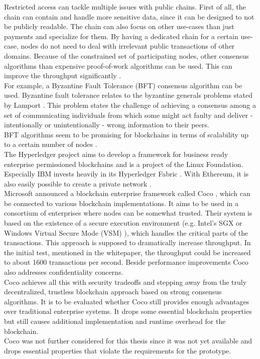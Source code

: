 \documentclass[a4paper,12pt]{scrartcl}
\begin{document}
Restricted access can tackle multiple issues with public chains. First of all, the chain can contain and handle more sensitive data, since it can be designed to not be publicly readable. The chain can also focus on other use-cases than just payments and specialize for them. By having a dedicated chain for a certain use-case, nodes do not need to deal with irrelevant public transactions of other domains. Because of the constrained set of participating nodes, other consensus algorithms than expensive proof-of-work algorithms can be used. This can improve the throughput significantly \cite{Pongnumkul2017}.\\

For example, a Byzantine Fault Tolerance (BFT) consensus algorithm can be used. Byzantine fault tolerance \cite{Jackson2005} relates to the byzantine generals problems stated by Lamport \cite{Lamport1982}. This problem states the challenge of achieving a consensus among a set of communicating individuals from which some might act faulty and deliver - intentionally or unintentionally - wrong information to their peers.\\
BFT algorithms seem to be promising for blockchains in terms of scalability up to a certain number of nodes \cite{Vukoli2016}\cite{Sousa2017}.\\

The Hyperledger project \cite{web89} aims to develop a framework for business ready enterprise permissioned blockchains and is a project of the Linux Foundation. Especially IBM invests heavily in its Hyperledger Fabric \cite{Cachin2016}. With Ethereum, it is also easily possible to create a private network \cite{web91}.\\

Microsoft announced a blockchain enterprise framework called Coco \cite{Coco2017}, which can be connected to various blockchain implementations. It aims to be used in a consortium of enterprises where nodes can be somewhat trusted. Their system is based on the existence of a secure execution environment (e.g. Intel's SGX \cite{web20} or Windows Virtual Secure Mode (VSM) \cite{web21}), which handles the critical parts of the transactions. This approach is supposed to dramatically increase throughput. In the initial test, mentioned in the whitepaper, the throughput could be increased to about 1600 transactions per second. Beside performance improvements Coco also addresses confidentiality concerns.\\
Coco achieves all this with security tradeoffs and stepping away from the truly decentralized, trustless blockchain approach based on strong consensus algorithms. It is to be evaluated whether Coco still provides enough advantages over traditional enterprise systems. It drops some essential blockchain properties but still causes additional implementation and runtime overhead for the blockchain.\\
Coco was not further considered for this thesis since it was not yet available and drops essential properties that violate the requirements for the prototype.
\end{document}
